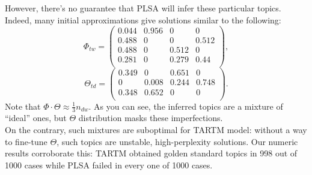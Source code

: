 However, there's no guarantee that PLSA will infer these particular topics. Indeed, many initial approximations give solutions similar to the following:
\[
\Phi_{tw} = 
\begin{pmatrix}
    0.044 & 0.956 & 0 & 0 \\
    0.488 & 0 &  0 & 0.512 \\
    0.488 & 0 & 0.512 & 0 \\
    0.281 & 0 & 0.279 & 0.44 \\
\end{pmatrix},
\]
\[
\Theta_{td} = 
\begin{pmatrix}
    0.349 & 0 & 0.651 & 0 \\
    0 & 0.008 & 0.244 & 0.748 \\
    0.348 & 0.652 & 0 & 0 \\
\end{pmatrix}.
\]
Note that $\Phi \cdot \Theta \approx \frac{1}{3} n_{dw}$. As you can see, the inferred topics are a mixture of ``ideal'' ones, but $\Theta$ distribution masks these imperfections.\\
On the contrary, such mixtures are suboptimal for TARTM model: without a way to fine-tune $\Theta$, such topics are unstable, high-perplexity solutions. Our numeric results corroborate this: TARTM obtained golden standard topics in 998 out of 1000 cases while PLSA failed in every one of 1000 cases.

